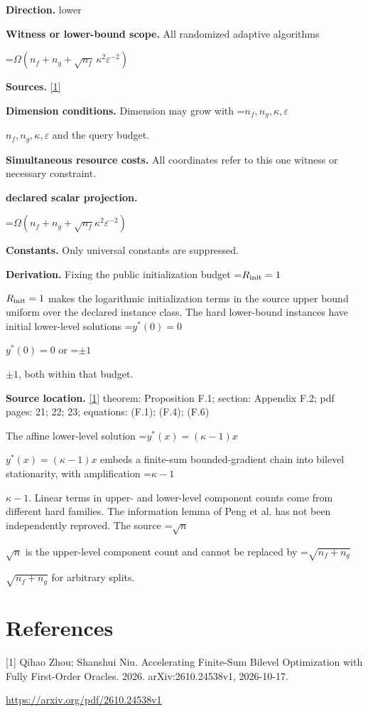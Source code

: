 \documentclass[10pt,a4paper]{article}
\newcommand{\AtlasMath}[1]{\par\begingroup\centering\setbox0=\hbox{$\displaystyle #1$}\ifdim\wd0>1.4\linewidth\typeout{ATLAS WIDE FORMULA: \the\wd0}\fi\ifdim\wd0>\linewidth\resizebox{\linewidth}{!}{\box0}\else\box0\fi\par\endgroup}
\newcommand{\AtlasInlineMath}[1]{\begingroup\setbox0=\hbox{$#1$}\ifdim\wd0>.4\linewidth\endgroup\AtlasMath{#1}\else\endgroup$#1$\fi}
\begin{document}
\textbf{Direction.} lower

\textbf{Witness or lower-bound scope.} All randomized adaptive algorithms

\AtlasMath{\Omega\!\left(n_f+n_g+\sqrt{n_f}\,\kappa^2\varepsilon^{-2}\right)}
\textbf{Sources.} \href{https://arxiv.org/pdf/2610.24538v1}{[1]}

\textbf{Dimension conditions.} Dimension may grow with \AtlasInlineMath{n_f,n_g,\kappa,\varepsilon} and the query budget.

\textbf{Simultaneous resource costs.} All coordinates refer to this one witness or necessary constraint.

\textbf{declared scalar projection.}

\AtlasMath{\Omega (n_f+n_g+\sqrt{n_f} \kappa ^2 \varepsilon ^{-2})}
\textbf{Constants.} Only universal constants are suppressed.

\textbf{Derivation.} Fixing the public initialization budget \AtlasInlineMath{R_{\rm init}=1} makes the logarithmic initialization terms in the source upper bound uniform over the declared instance class. The hard lower-bound instances have initial lower-level solutions \AtlasInlineMath{y^*(0)=0} or \AtlasInlineMath{\pm1}, both within that budget.

\textbf{Source location.} \href{https://arxiv.org/pdf/2610.24538v1}{[1]} theorem: Proposition F.1; section: Appendix F.2; pdf pages: 21; 22; 23; equations: (F.1); (F.4); (F.6)

The affine lower-level solution \AtlasInlineMath{y^*(x)=(\kappa-1)x} embeds a finite-sum bounded-gradient chain into bilevel stationarity, with amplification \AtlasInlineMath{\kappa-1}. Linear terms in upper- and lower-level component counts come from different hard families. The information lemma of Peng et al. has not been independently reproved. The source \AtlasInlineMath{\sqrt n} is the upper-level component count and cannot be replaced by \AtlasInlineMath{\sqrt{n_f+n_g}} for arbitrary splits.

\section{References}
[1] Qihao Zhou; Shanshui Niu. Accelerating Finite-Sum Bilevel Optimization with Fully First-Order Oracles. 2026. arXiv:2610.24538v1, 2026-10-17.

\url{https://arxiv.org/pdf/2610.24538v1}
\end{document}
